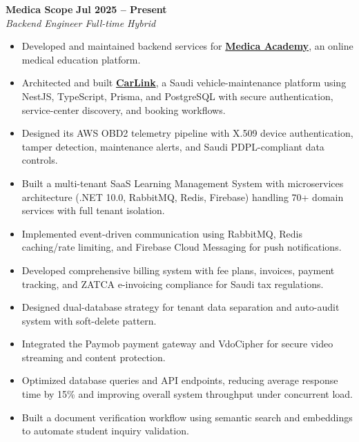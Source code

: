 \documentclass[letterpaper, 11pt]{article}
\begin{document}
\textbf{Medica Scope} \hfill \textbf{Jul 2025 -- Present} \\
\textit{Backend Engineer \textbar{} Full-time Hybrid}
\begin{itemize}[leftmargin=1.5em, nosep, itemsep=0.1em]
  \item Developed and maintained backend services for \href{https://medicaacademy.com/}{\textbf{Medica Academy}}, an online medical education platform.
  \item Architected and built \href{https://carlink.dev/}{\textbf{CarLink}}, a Saudi vehicle-maintenance platform using NestJS, TypeScript, Prisma, and PostgreSQL with secure authentication, service-center discovery, and booking workflows.
  \item Designed its AWS OBD2 telemetry pipeline with X.509 device authentication, tamper detection, maintenance alerts, and Saudi PDPL-compliant data controls.
  \item Built a multi-tenant SaaS Learning Management System with microservices architecture (.NET 10.0, RabbitMQ, Redis, Firebase) handling 70+ domain services with full tenant isolation.
  \item Implemented event-driven communication using RabbitMQ, Redis caching/rate limiting, and Firebase Cloud Messaging for push notifications.
  \item Developed comprehensive billing system with fee plans, invoices, payment tracking, and ZATCA e-invoicing compliance for Saudi tax regulations.
  \item Designed dual-database strategy for tenant data separation and auto-audit system with soft-delete pattern.
  \item Integrated the Paymob payment gateway and VdoCipher for secure video streaming and content protection.
  \item Optimized database queries and API endpoints, reducing average response time by 15\% and improving overall system throughput under concurrent load.
  \item Built a document verification workflow using semantic search and embeddings to automate student inquiry validation.
\end{itemize}
\end{document}
